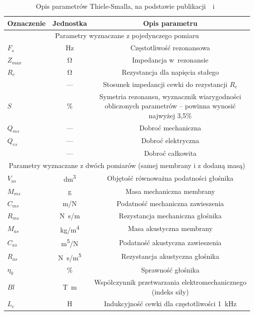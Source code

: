 \documentclass[12pt]{oska}
\begin{document}
	\begin{table}[!ht]
		\centering
		\caption{Opis parametrów Thiele-Smalla, na podstawie publikacji~\cite{BK_pulse_TS}~i~\cite{dobrucki}}
		\label{t:TS_opis}
		\begin{tabular}{|l|c|c|}
			\hline
			\textbf{Oznaczenie} & \textbf{Jednostka} & \textbf{Opis parametru}\\\hline\hline
			\multicolumn{3}{|c|}{Parametry wyznaczane z pojedynczego pomiaru} \\\hline\hline
			$F_s$ & \si{\hertz} & Częstotliwość rezonansowa \\\hline
			$Z_{max}$ & \si{\ohm} & Impedancja w~rezonansie \\\hline
			$R_e$ & \si{\ohm} & Rezystancja dla napięcia stałego \\\hline
			\gape{$r_0=\frac{Z_{max}}{R_e}$} & --- & Stosunek impedancji cewki do rezystancji $R_e$ \\\hline
			$S$ & \% & \makecell{Symetria rezonansu, wyznacznik wiarygodności\\obliczonych parametrów -- powinna wynosić najwyżej 3,5\%} \\\hline
			\hline
			$Q_{ms}$ & --- & Dobroć mechaniczna \\\hline
			$Q_{es}$ & --- & Dobroć elektryczna \\\hline
			\gape{$Q_{ts}=\frac{Q_{ms}\cdot Q_{es}}{Q_{ms}+Q_{es}}$} & --- & Dobroć całkowita \\\hline
			\hline
			\multicolumn{3}{|c|}{Parametry wyznaczane z dwóch pomiarów (samej membrany i z dodaną masą)} \\\hline\hline
			$V_{as}$ & \si{\deci\metre\cubed} & Objętość równoważna podatności głośnika \\\hline
			$M_{ms}$ & \si{\gram} & Masa mechaniczna membrany \\\hline
			$C_{ms}$ & \si[per-mode=symbol]{\metre\per\newton} & Podatność mechaniczna zawieszenia \\\hline
			$R_{ms}$ & \si[per-mode=symbol]{\newton\s\per\m} & Rezystancja mechaniczna głośnika \\\hline
			\hline
			$M_{as}$ & \si[per-mode=symbol]{\kilo\gram\per\metre\tothe{4}} & Masa akustyczna membrany \\\hline
			$C_{as}$ & \si[per-mode=symbol]{\metre\tothe{5}\per\newton} & Podatność akustyczna zawieszenia \\\hline
			$R_{as}$ & \si[per-mode=symbol]{\newton\s\per\metre\tothe{5}} & Rezystancja akustyczna głośnika \\\hline
			\hline
			$\eta_0$ & \% & Sprawność głośnika \\\hline
			$Bl$ & \si{\tesla\metre} & \makecell{Współczynnik przetwarzania elektromechanicznego\\(indeks siły)} \\\hline
			$L_{e}$ & \si{\henry} & Indukcyjność cewki dla częstotliwości \SI{1}{\kilo\hertz} \\\hline
		\end{tabular}
	\end{table}
	
\end{document}
